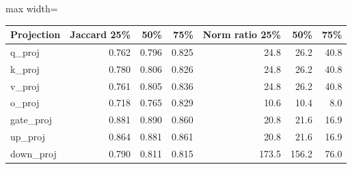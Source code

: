 \scriptsize
\setlength{\tabcolsep}{3.5pt}
\label{tab:t1masks}
\begin{adjustbox}{max width=\linewidth}
\begin{tabular}{lrrrrrr}
\toprule
Projection & Jaccard 25\% & 50\% & 75\% & Norm ratio 25\% & 50\% & 75\% \\
\midrule
q\_proj & 0.762 & 0.796 & 0.825 & 24.8 & 26.2 & 40.8 \\
k\_proj & 0.780 & 0.806 & 0.826 & 24.8 & 26.2 & 40.8 \\
v\_proj & 0.761 & 0.805 & 0.836 & 24.8 & 26.2 & 40.8 \\
o\_proj & 0.718 & 0.765 & 0.829 & 10.6 & 10.4 & 8.0 \\
gate\_proj & 0.881 & 0.890 & 0.860 & 20.8 & 21.6 & 16.9 \\
up\_proj & 0.864 & 0.881 & 0.861 & 20.8 & 21.6 & 16.9 \\
down\_proj & 0.790 & 0.811 & 0.815 & 173.5 & 156.2 & 76.0 \\
\bottomrule
\end{tabular}
\end{adjustbox}
